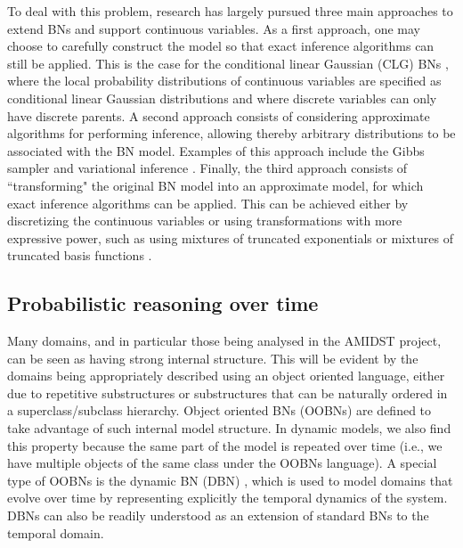 To deal with this problem, research has largely pursued three main approaches to extend BNs and support continuous variables. As a first approach, one may choose to carefully construct the model so that exact inference algorithms can still be applied. This is the case for the conditional linear Gaussian (CLG) BNs \cite{Lauritzen1992,LauritzenJensen2001}, where the local probability distributions of continuous variables are specified as conditional linear Gaussian distributions and where discrete variables can only have discrete parents. A second approach consists of considering approximate algorithms for performing inference, allowing thereby arbitrary distributions to be associated with the BN model. Examples of this approach include the Gibbs sampler \cite{Geman1984, hrycej1990gibbs} and variational inference \cite{Jordan1999}. Finally, the third approach consists of ``transforming" the original BN model into an approximate model, for which exact inference algorithms can be applied. This can be achieved either by discretizing the continuous variables \cite{KozlovKollerUAI97} or using transformations with more expressive power, such as using mixtures of truncated exponentials \cite{Moral2001} or mixtures of truncated basis functions \cite{Langseth12}.

\subsection{Probabilistic reasoning over time}\label{SubSection:DBNs}

Many domains, and in particular those being analysed in the AMIDST project, can be seen as having strong internal structure. This will be evident by the domains being appropriately described using an object oriented language, either due to repetitive substructures or substructures that can be naturally ordered in a superclass/subclass hierarchy.  Object oriented BNs \cite{KollerPfeffer1997} (OOBNs) are defined to take advantage of such internal model structure. In dynamic models, we also find this property because the same part of the model is repeated over time (i.e., we have multiple objects of the same class under the OOBNs language). A special type of OOBNs is the dynamic BN (DBN) \cite{DeanKanazawa1989}, which is used to model domains that evolve over time by representing explicitly the temporal dynamics of the system. DBNs can also be readily understood as an extension of standard BNs to the temporal domain. 

